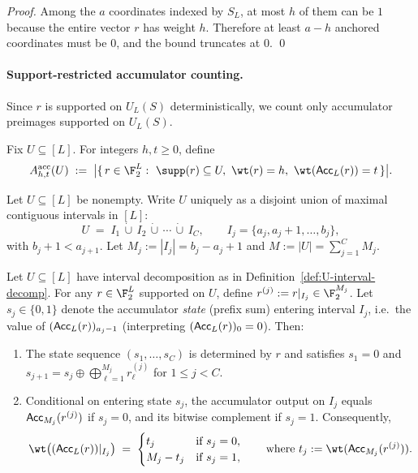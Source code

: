 \begin{proof}
Among the $a$ coordinates indexed by $S_L$, at most $h$ of them can be $1$ because the entire vector $r$
has weight $h$. Therefore at least $a-h$ anchored coordinates must be $0$, and the bound truncates at $0$.
\qed
\end{proof}

\paragraph{Support-restricted accumulator counting.}
Since $r$ is supported on $U_L(S)$ deterministically, we count only accumulator preimages supported on $U_L(S)$.

\begin{definition}
\label{def:restricted-acc-count}
Fix $U\subseteq [L]$. For integers $h,t\ge 0$, define
\[
A^{\mathrm{acc}}_{h,t}(U)
\;:=\;
\big|\{\,r\in\F_2^L:\ \supp(r)\subseteq U,\ \wt(r)=h,\ \wt({\sf Acc}_L(r))=t\,\}\big|.
\]
\end{definition}

\begin{definition}
\label{def:U-interval-decomp}
Let $U\subseteq [L]$ be nonempty.
Write $U$ uniquely as a disjoint union of maximal contiguous intervals in $[L]$:
\[
U \;=\; I_1 \,\dot\cup\, I_2 \,\dot\cup\, \cdots \,\dot\cup\, I_C,
\qquad
I_j = \{a_j, a_j+1,\dots,b_j\},
\]
with $b_j+1<a_{j+1}$.
Let $M_j:=|I_j|=b_j-a_j+1$ and $M:=|U|=\sum_{j=1}^C M_j$.
\end{definition}

\begin{lemma}
\label{lem:acc-restricted-factorization}
Let $U\subseteq [L]$ have interval decomposition as in Definition~\ref{def:U-interval-decomp}.
For any $r\in\F_2^L$ supported on $U$, define $r^{(j)}:=r|_{I_j}\in\F_2^{M_j}$.
Let $s_j\in\{0,1\}$ denote the accumulator \emph{state} (prefix sum) entering interval $I_j$,
i.e.\ the value of $({\sf Acc}_L(r))_{a_j-1}$ (interpreting $({\sf Acc}_L(r))_{0}=0$).
Then:
\begin{enumerate}
\item The state sequence $(s_1,\dots,s_C)$ is determined by $r$ and satisfies
      $s_1=0$ and $s_{j+1}=s_j\oplus \bigoplus_{\ell=1}^{M_j} r^{(j)}_\ell$ for $1\le j<C$.
\item Conditional on entering state $s_j$, the accumulator output on $I_j$ equals
      ${\sf Acc}_{M_j}(r^{(j)})$ if $s_j=0$, and its bitwise complement if $s_j=1$.
      Consequently,
\[
\wt\big(({\sf Acc}_L(r))|_{I_j}\big)
\;=\;
\begin{cases}
t_j & \text{if } s_j=0,\\
M_j-t_j & \text{if } s_j=1,
\end{cases}
\qquad\text{where } t_j:=\wt({\sf Acc}_{M_j}(r^{(j)})).
\]
\end{enumerate}
\end{lemma}


